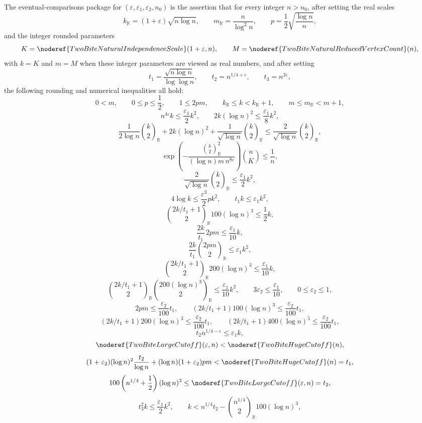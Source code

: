 \begin{definition}
The eventual-comparisons package for
\((\varepsilon,\varepsilon_1,\varepsilon_2,n_0)\) is the assertion that for
every integer \(n>n_0\), after setting the real scales
\[
k_{\mathbb R}=(1+\varepsilon)\sqrt{n\log n},\qquad
m_{\mathbb R}=\frac{n}{\log^2 n},\qquad
p=\frac12\sqrt{\frac{\log n}{n}},
\]
and the integer rounded parameters
\[
K=\noderef{TwoBiteNaturalIndependenceScale}(1+\varepsilon,n),\qquad
M=\noderef{TwoBiteNaturalReducedVertexCount}(n),
\]
with \(k=K\) and \(m=M\) when these integer parameters are viewed as real
numbers, and after setting
\[
t_1=\frac{\sqrt{n\log n}}{\log\log n},\qquad
t_2=n^{1/4+\varepsilon},\qquad
t_3=n^{2\varepsilon},
\]
the following rounding and numerical inequalities all hold:
\[
0<m,\qquad
0\le p\le\frac12,\qquad
1\le 2pm,\qquad
k_{\mathbb R}\le k<k_{\mathbb R}+1,\qquad
m\le m_{\mathbb R}<m+1,
\]
\[
n^{4\varepsilon}k\le \frac{\varepsilon_1}{2}k^2,\qquad
2k(\log n)^2\le \frac{\varepsilon_1}{8}k^2,
\]
\[
\frac{1}{2\log n}\binom{k}{2}_{\mathbb R}
  +2k(\log n)^2
  +\frac{1}{\sqrt{\log n}}\binom{k}{2}_{\mathbb R}
  \le
  \frac{2}{\sqrt{\log n}}\binom{k}{2}_{\mathbb R},
\]
\[
\exp\!\left(
  -\frac{\binom{k}{2}_{\mathbb R}^2}
  {(\log n)m\,n^{8\varepsilon}}
  \right)\binom{n}{K}\le \frac1n,
\]
\[
\frac{2}{\sqrt{\log n}}\binom{k}{2}_{\mathbb R}
  \le \frac{\varepsilon_1}{2}k^2,
\]
\[
4\log k\le \frac{\varepsilon^3}{2}pk^2,\qquad
t_1k\le \varepsilon_1k^2,
\]
\[
\binom{2k/t_1+1}{2}_{\mathbb R}100(\log n)^3\le \frac12 k,
\]
\[
\frac{2k}{t_1}\,2pm\le \frac{\varepsilon_1}{10}k,
\]
\[
\frac{2k}{t_1}\binom{2pm}{2}_{\mathbb R}\le \varepsilon_1k^2,
\]
\[
\binom{2k/t_1+1}{2}_{\mathbb R}200(\log n)^3
  \le \frac{\varepsilon_1}{10}k,
\]
\[
\binom{2k/t_1+1}{2}_{\mathbb R}
  \binom{200(\log n)^3}{2}_{\mathbb R}
  \le \frac{\varepsilon_1}{10}k^2,\qquad
3\varepsilon_2\le \frac{\varepsilon_1}{10},
\qquad
0\le\varepsilon_2\le1,
\]
\[
2pm\le\frac{\varepsilon_2}{100}t_1,\qquad
(2k/t_1+1)100(\log n)^3\le\frac{\varepsilon_2}{100}t_1,
\]
\[
(2k/t_1+1)200(\log n)^3\le\frac{\varepsilon_2}{100}t_1,\qquad
(2k/t_1+1)400(\log n)^5\le\frac{\varepsilon_2}{100}t_1,
\]
\[
t_2n^{1/4-\varepsilon}\le \varepsilon_1k,
\]
\[
\noderef{TwoBiteLargeCutoff}(\varepsilon,n)
  <\noderef{TwoBiteHugeCutoff}(n),
\]
\[
(1+\varepsilon_2)(\log n)^2\frac{t_2}{\log n}
  +(\log n)(1+\varepsilon_2)pm
  < \noderef{TwoBiteHugeCutoff}(n)=t_1,
\]
\[
100\left(n^{1/4}+\frac12\right)(\log n)^3
  \le \noderef{TwoBiteLargeCutoff}(\varepsilon,n)=t_2,
\]
\[
t_3^2k\le \frac{\varepsilon_1}{2}k^2,\qquad
k<n^{1/4}t_2-\binom{n^{1/4}}{2}_{\mathbb R}100(\log n)^3,
\]
\end{definition}
